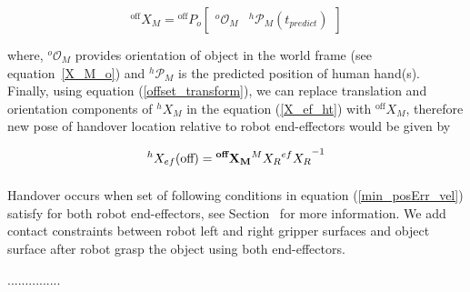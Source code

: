 \documentclass[a4paper, 12pt, oneside]{Thesis}  %
\begin{document}

\begin{equation}\label{offset_transform}
{}^\text{off}{X}_{M} = 
{}^\text{off}{P}_{o}
 \left[\begin{array}{cc}
{}^{o}\mathcal{O}_M & {}^{h}\mathcal{P}_M(t_{predict})
\end{array}\right]
\end{equation}


where, ${}^{o}\mathcal{O}_M$ provides orientation of object in the world frame (see equation~\ref{X_M_o}) and ${}^{h}\mathcal{P}_M$ is the predicted position of human hand(s). Finally, using equation (\ref{offset_transform}), we can replace translation and orientation components of ${}^{h}{X}_M$ in the equation (\ref{X_ef_ht}) with ${}^\text{off}{X}_{M}$, therefore new pose of handover location relative to robot end-effectors would be given by


\begin{equation}
	{}^{h}{X}_{ef}(\text{off}) =  {\bf{}^{\text{\bf off}}{X}_M}  {}^{M}{X}_R {{}^{ef}{X}_R}^{-1}
\end{equation}


\paragraph*{}
Handover occurs when set of following conditions in equation (\ref{min_posErr_vel}) satisfy for both robot end-effectors, see Section~ for more information. We add contact constraints between robot left and right gripper surfaces and object surface after robot grasp the object using both end-effectors. 

...............
%
%
%
%
\end{document}
